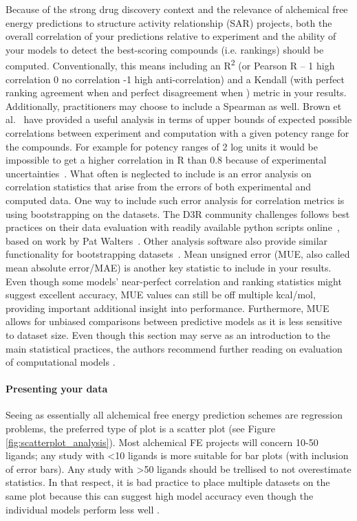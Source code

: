 \documentclass[9pt,bestpractices]{livecoms}
\begin{document}
Because of the strong drug discovery context and the relevance of alchemical free energy predictions to structure activity relationship (SAR) projects, both the overall correlation of your predictions relative to experiment and the ability of your models to detect the best-scoring compounds (i.e. rankings) should be computed. Conventionally, this means including an R\textsuperscript{2} (or Pearson R -- 1 high correlation 0 no correlation -1 high anti-correlation) and a Kendall \texttau{} (with perfect ranking agreement when  and perfect disagreement when ) metric in your results. Additionally, practitioners may choose to include a Spearman \textrho{} as well. Brown et al.~\cite{brown2009healthy} have provided a useful analysis in terms of upper bounds of expected possible correlations between experiment and computation with a given potency range for the compounds. For example for potency ranges of 2 log units it would be impossible to get a higher correlation in R than 0.8 because of experimental uncertainties~\cite{brown2009healthy}. What often is neglected to include is an error analysis on correlation statistics that arise from the errors of both experimental and computed data. One way to include such error analysis for correlation metrics is using bootstrapping on the datasets. The D3R community challenges follows best practices on their data evaluation with readily available python scripts online~\cite{2018drugdata}, based on work by Pat Walters~\cite{walters2013what}. Other analysis software also provide similar functionality for bootstrapping datasets~\cite{antonia2019michellab}. 
%
Mean unsigned error (MUE, also called mean absolute error/MAE) is another key statistic to include in your results. Even though some models' near-perfect correlation and ranking statistics might suggest excellent accuracy, MUE values can still be off multiple kcal/mol, providing important additional insight into performance. Furthermore, MUE allows for unbiased comparisons between predictive models as it is less sensitive to dataset size. Even though this section may serve as an introduction to the main statistical practices, the authors recommend further reading on evaluation of computational models \cite{jain2008recommendations, walters2013what, brown2009healthy, walterthoughts}.
%

\paragraph{Presenting your data}
Seeing as essentially all alchemical free energy prediction schemes are regression problems, the preferred type of plot is a scatter plot (see Figure \ref{fig:scatterplot_analysis}). Most alchemical FE projects will concern 10-50 ligands; any study with \textless10 ligands is more suitable for bar plots (with inclusion of error bars). Any study with \textgreater50 ligands should be trellised to not overestimate statistics. In that respect, it is bad practice to place multiple datasets on the same plot because this can suggest high model accuracy even though the individual models perform less well \cite{walterthoughts}.
%
\end{document}
